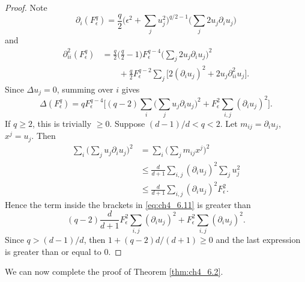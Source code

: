\begin{proof}
Note
\[
    \partial_i(F_\epsilon^q) = \frac{q}{2}\Big(\epsilon^2 + \sum_j u_j^2\Big)^{q/2-1}\Big(\sum_j 2u_j\partial_i u_j\Big)
\]
and
\begin{align*}
    \partial_{ii}^2(F_\epsilon^q) &= \frac{q}{2}\Big(\frac{q}{2}-1\Big)F_\epsilon^{q-4}\Big(\sum_j 2u_j\partial_i u_j\Big)^2 \\
    &\qquad+ \frac{q}{2}F_\epsilon^{q-2}\sum_j \Big[2(\partial_i u_j)^2 + 2u_j\partial_{ii}^2 u_j\Big].
\end{align*}
Since $\Delta u_j = 0$, summing over $i$ gives
\begin{equation}\label{eq:ch4_6.11}
    \Delta(F_\epsilon^q) = qF_\epsilon^{q-4}\Big[(q-2)\sum_i\Big(\sum_j u_j\partial_i u_j\Big)^2 + F_\epsilon^2\sum_{i,j}(\partial_i u_j)^2\Big].
\end{equation}
If $q \geq 2$, this is trivially $\geq 0$. Suppose $(d-1)/d < q < 2$. Let $m_{ij} = \partial_i u_j$, $x^j = u_j$. Then
\begin{align*}
    \sum_i\Big(\sum_j u_j\partial_i u_j\Big)^2 &= \sum_i\Big(\sum_j m_{ij}x^j\Big)^2 \\
    &\leq \frac{d}{d+1}\sum_{i,j}(\partial_i u_j)^2\sum_j u_j^2 \\
    &\leq \frac{d}{d+1}\sum_{i,j}(\partial_i u_j)^2 F_\epsilon^2.
\end{align*}
Hence the term inside the brackets in \eqref{eq:ch4_6.11} is greater than
\[
    (q-2)\frac{d}{d+1}F_\epsilon^2\sum_{i,j}(\partial_i u_j)^2 + F_\epsilon^2\sum_{i,j}(\partial_i u_j)^2.
\]
Since $q > (d-1)/d$, then $1+(q-2)d/(d+1) \geq 0$ and the last expression is greater than or equal to $0$.
\end{proof}


We can now complete the proof of Theorem \ref{thm:ch4_6.2}.

